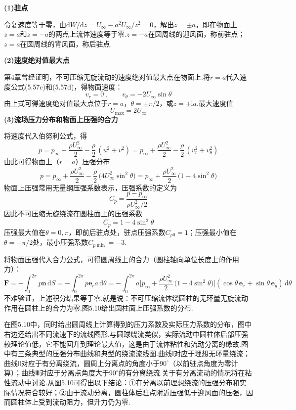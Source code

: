 \textbf{(1)驻点}

令复速度等于零，由$\mathrm{d}W/\mathrm{d}z=U_\infty-a^{2}U_\infty/z^{2}=0$，解出$z=\pm a$，即在物面上$z=a$和$z=-a$的两点上流体速度等于零.$z=-a$在圆周线的迎风面，称前驻点；$z=a$在圆周线的背风面，称后驻点.

\textbf{(2)速度绝对值最大点}

第4章曾经证明，不可压缩无旋流动的速度绝对值最大点在物面上.将$r=a$代入速度公式(5.57c)和(5.57d)，得物面速度：
\[
v_r=0\,,\qquad v_\theta=-2U_\infty\sin\theta
\]
由上式可得速度绝对值最大点位于$r=a$，$\theta=\pm\pi/2$，或$z=\pm\mathrm{i}a$.最大速度值
\begin{equation*}
U_{\max}=2U_\infty
\tag{5.58}
\end{equation*}
\textbf{(3)流场压力分布和物面上压强的合力}

将速度代入伯努利公式，得
\[
p=p_\infty+\frac{\rho U_\infty^{2}}{2}-\frac{\rho}{2}\,(u^{2}+v^{2})=p_\infty+\frac{\rho U_\infty^{2}}{2}-\frac{\rho}{2}\,(v_r^{2}+v_\theta^{2})
\]
由此可得物面上（$r=a$）压强分布
\begin{equation*}
p=p_\infty+\frac{\rho U_\infty^{2}}{2}-\frac{\rho}{2}\,\big(4U_\infty^{2}\sin^{2}\theta\big)=p_\infty+\frac{\rho U_\infty^{2}}{2}\,\big(1-4\sin^{2}\theta\big)
\tag{5.59}
\end{equation*}
物面上压强常用无量纲压强系数表示，压强系数的定义为
\begin{equation*}
C_p=\frac{p-p_\infty}{\rho U_\infty^{2}\big/2}
\tag{5.60}
\end{equation*}
因此不可压缩无旋绕流在圆柱面上的压强系数
\begin{equation*}
C_p=1-4\sin^{2}\theta
\tag{5.61}
\end{equation*}
压强最大值在$\theta=0,\pi$，即前后驻点处，驻点压强系数$C_{p0}=1$；压强最小值在$\theta=\pm\pi/2$处，最小压强系数$C_{p\min}=-3$.

将物面压强代入合力公式，可得圆周线上的合力（圆柱轴向单位长度上的作用力）：
\[
\boldsymbol{F}=-\int_0^{2\pi}p\boldsymbol{n}\,\mathrm{d}S=-\int_0^{2\pi}p\boldsymbol{e}_r a\,\mathrm{d}\theta=-\int_0^{2\pi}a\bigg[p_\infty+\frac{\rho U_\infty^{2}}{2}\,\big(1-4\sin^{2}\theta\big)\bigg](\cos\theta\,\boldsymbol{e}_x+\sin\theta\,\boldsymbol{e}_y)\,\mathrm{d}\theta
\]
不难验证，上述积分结果等于零.就是说：不可压缩流体绕圆柱的无环量无旋流动作用在圆柱上的合力为零.图5.10给出圆柱面上压强系数的分布.

在图5.10中，同时给出圆周线上计算得到的压力系数及实际压力系数的分布，图中右边还给出不同流速下的流线图形.与圆球绕流类似，实际流动中圆柱体后部压强较理论值低，它不能回升到理论最大值，这是由于流体粘性和流动分离的缘故.图中有三条典型的压强分布曲线和典型的绕流流线图.曲线Ⅰ对应于理想无环量绕流；曲线Ⅱ对应于有分离绕流，圆周上分离点的角度小于$90^{\circ}$（以前驻点角度为零计算）；曲线Ⅲ对应于分离点角度大于$90^{\circ}$的有分离绕流.关于有分离流动的情况将在粘性流动中讨论.从图5.10可得出以下结论：①在分离以前理想绕流的压强分布和实际情况符合较好；②由于流动分离，圆柱体后驻点附近压强低于迎风面的压强，因而圆柱体上受到流动阻力，但升力仍为零.

